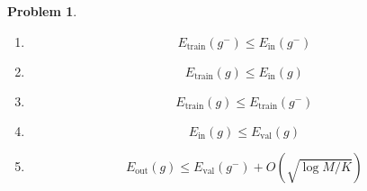 \documentclass[10pt]{exam}
\theoremstyle{definition}
\newtheorem{problem}{Problem}
\newcommand{\Ein}{E_{\text{in}}}
\newcommand{\Eout}{E_{\text{out}}}
\newcommand{\Etrain}{E_{\text{train}}}
\newcommand{\Eval}{E_{\text{val}}}
\begin{document}
\newpage
\begin{problem}

    \begin{enumerate}
        \item 
            \begin{equation}
                \Etrain(g^-) \le \Ein(g^-)
            \end{equation}
        \item 
            \begin{equation}
                \Etrain(g) \le \Ein(g)
            \end{equation}
        \item 
            \begin{equation}
                \Etrain(g) \le \Etrain(g^-)
            \end{equation}
        \item 
            \begin{equation}
                \Ein(g) \le \Eval(g)
            \end{equation}
        \item 
            \begin{equation}
                \Eout(g) \le \Eval(g^-) + O(\sqrt{\log M/K})
            \end{equation}
    \end{enumerate}
\end{problem}
\end{document}
